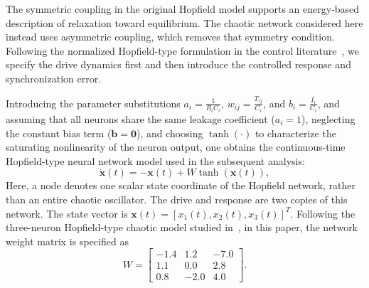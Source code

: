 \documentclass[a4paper,fleqn]{cas-dc}
\theoremstyle{plain}
\theoremstyle{definition}
\begin{document}
The symmetric coupling in the original Hopfield model supports an energy-based description of relaxation toward equilibrium. The chaotic network considered here instead uses asymmetric coupling, which removes that symmetry condition. Following the normalized Hopfield-type formulation in the control literature~\cite{LI2013a, mahmoud2021analysis}, we specify the drive dynamics first and then introduce the controlled response and synchronization error.

Introducing the parameter substitutions $a_i = \frac{1}{R_i C_i}$, $w_{ij} = \frac{T_{ij}}{C_i}$, and $b_i = \frac{I_i}{C_i}$, and assuming that all neurons share the same leakage coefficient ($a_i=1$), neglecting the constant bias term ($\mathbf{b}=\mathbf{0}$), and choosing $\tanh(\cdot)$ to characterize the saturating nonlinearity of the neuron output, one obtains the continuous-time Hopfield-type neural network model used in the subsequent analysis:
\begin{equation}
	\dot{\mathbf{x}}(t) = -\mathbf{x}(t) + W \tanh(\mathbf{x}(t)),
	\label{eq:hopfield_simplified_vector}
\end{equation}
Here, a node denotes one scalar state coordinate of the Hopfield network, rather than an entire chaotic oscillator. The drive and response are two copies of this network. The state vector is $\mathbf{x}(t) = [x_1(t), x_2(t), x_3(t)]^T$. Following the three-neuron Hopfield-type chaotic model studied in~\cite{mahmoud2021analysis}, in this paper, the network weight matrix is specified as
\begin{equation}
	W = \begin{bmatrix}
		-1.4 & 1.2 & -7.0 \\
		1.1 & 0.0 & 2.8 \\
		0.8 & -2.0 & 4.0
	\end{bmatrix}.
	\label{eq:weight_matrix}
\end{equation}
\end{document}
